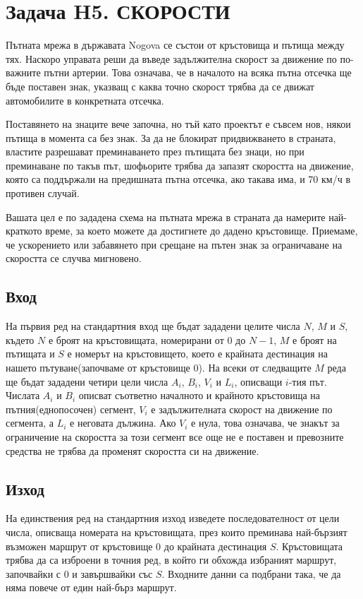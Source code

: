 \documentclass[12pt]{article}
\begin{document}
\section{Задача H5. СКОРОСТИ}

Пътната мрежа в държавата Nogova се състои от кръстовища и пътища между тях. Наскоро управата реши да въведе задължителна скорост за движение по по-важните пътни артерии. Това означава, че в началото на всяка пътна отсечка ще бъде поставен знак, указващ с каква точно скорост трябва да се движат автомобилите в конкретната отсечка. 

Поставянето на знаците вече започна, но тъй като проектът е съвсем нов, някои пътища в момента са без знак. За да не блокират придвижването в страната, властите разрешават преминаването през пътищата без знаци, но при преминаване по такъв път, шофьорите трябва да запазят скоростта на движение, която са поддържали на предишната пътна отсечка, ако такава има, и 70 км/ч в противен случай.

Вашата цел е по зададена схема на пътната мрежа в страната да намерите най-краткото време, за което можете да достигнете до дадено кръстовище. Приемаме, че ускорението или забавянето при срещане на пътен знак за ограничаване на скоростта се случва мигновено.

\subsection{Вход}

На първия ред на стандартния вход ще бъдат зададени целите числа $N$, $M$ и $S$, където $N$ е броят на кръстовищата, номерирани от $0$ до $N-1$, $M$ е броят на пътищата и $S$ е номерът на
кръстовището, което е крайната дестинация на нашето пътуване(започваме от кръстовище 0). На 
всеки от следващите $M$ реда ще бъдат зададени  четири цели числа $A_i$, $B_i$, $V_i$ и $L_i$, описващи $i$-тия път. 
Числата $A_i$ и $B_i$ описват съответно началното и крайното кръстовища на пътния(еднопосочен) сегмент, $V_i$ е задължителната скорост на движение по сегмента, а $L_i$ е неговата дължина. Ако $V_i$ е нула, това означава, че знакът за ограничение
на скоростта за този сегмент все още не е поставен и превозните средства не трябва да променят скоростта си на движение.


\subsection{Изход}

На единствения ред на стандартния изход изведете последователност от цели числа,
описваща номерата на кръстовищата, през които преминава най-бързият възможен маршрут от
кръстовище $0$ до крайната дестинация $S$. Кръстовищата трябва да са изброени в точния ред, в
който ги обхожда избраният маршрут, започвайки с $0$ и завършвайки със $S$. Входните данни са
подбрани така, че да няма повече от един най-бърз маршрут.
\end{document}
